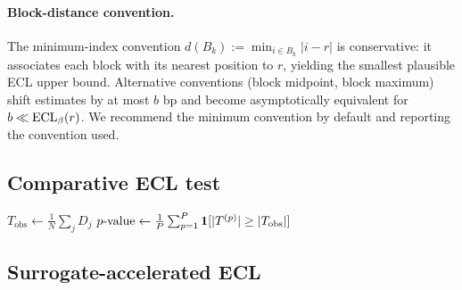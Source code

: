 \begin{algorithm}[H]
\caption{Multi-scale block ECL}\label{alg:multiscale}
\BlankLine
{}
\end{algorithm}

\paragraph{Block-distance convention.}
The minimum-index convention $d(B_k) := \min_{i\in B_k}|i-r|$ is conservative: it associates each block with its nearest position to $r$, yielding the smallest plausible ECL upper bound. Alternative conventions (block midpoint, block maximum) shift estimates by at most $b$ bp and become asymptotically equivalent for $b \ll \mathrm{ECL}_\beta(r)$. We recommend the minimum convention by default and reporting the convention used.

\subsection{Comparative ECL test}

\begin{algorithm}[H]
\caption{Permutation test for ECL comparison}\label{alg:compare}
\BlankLine
{}
$T_{\mathrm{obs}} \leftarrow \frac{1}{N}\sum_j D_j$\;
$p\text{-value} \leftarrow \frac{1}{P}\sum_{p=1}^P \mathbf{1}[|T^{(p)}| \ge |T_{\mathrm{obs}}|]$\;
\end{algorithm}

\subsection{Surrogate-accelerated ECL}

